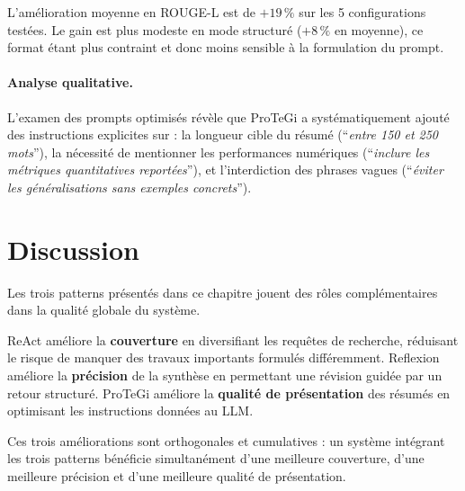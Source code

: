L'amélioration moyenne en ROUGE-L est de $+19\,\%$ sur les 5 configurations
testées. Le gain est plus modeste en mode structuré ($+8\,\%$ en moyenne),
ce format étant plus contraint et donc moins sensible à la formulation
du prompt.

\paragraph{Analyse qualitative.}
L'examen des prompts optimisés révèle que ProTeGi a systématiquement
ajouté des instructions explicites sur : la longueur cible du résumé
(``\textit{entre 150 et 250 mots}''), la nécessité de mentionner les
performances numériques (``\textit{inclure les métriques quantitatives
reportées}''), et l'interdiction des phrases vagues (``\textit{éviter
les généralisations sans exemples concrets}'').

\section{Discussion}

Les trois patterns présentés dans ce chapitre jouent des rôles complémentaires
dans la qualité globale du système.

ReAct améliore la \textbf{couverture} en diversifiant les requêtes de recherche,
réduisant le risque de manquer des travaux importants formulés différemment.
Reflexion améliore la \textbf{précision} de la synthèse en permettant une
révision guidée par un retour structuré. ProTeGi améliore la \textbf{qualité
de présentation} des résumés en optimisant les instructions données au LLM.

Ces trois améliorations sont orthogonales et cumulatives : un système intégrant
les trois patterns bénéficie simultanément d'une meilleure couverture,
d'une meilleure précision et d'une meilleure qualité de présentation.
